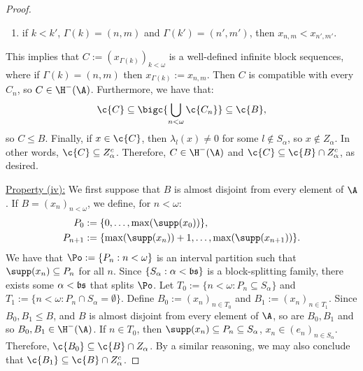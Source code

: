 \documentclass[11pt,reqno]{amsart}
\begin{document}
\begin{proof}
\begin{enumerate}
        \item if $k < k'$, $\Gamma(k) = (n,m)$ and $\Gamma(k') = (n',m')$, then $x_{n,m} < x_{n',m'}$.
    \end{enumerate}
    This implies that $C := (x_{\Gamma(k)})_{k<\omega}$ is a well-defined infinite block sequences, where if $\Gamma(k) = (n,m)$ then $x_{\Gamma(k)} := x_{n,m}$. Then $C$ is compatible with every $C_n$, so $C \in \H^-(\A)$. Furthermore, we have that:
    \begin{align*}
        \c{C} \subseteq \bigc{\bigcup_{n<\omega} \c{C_n}} \subseteq \c{B},
    \end{align*}
    so $C \leq B$. Finally, if $x \in \c{C}$, then $\lambda_l(x) \neq 0$ for some $l \notin S_\alpha$, so $x \notin Z_\alpha$. In other words, $\c{C} \subseteq Z_\alpha^c$. Therefore, $C \in \H^-(\A)$ and $\c{C} \subseteq \c{B} \cap Z_\alpha^c$, as desired.

    \underline{Property (iv):} We first suppose that $B$ is almost disjoint from every element of $\A$. If $B = (x_n)_{n<\omega}$, we define, for $n < \omega$:
    \begin{align*}
        P_0 &:= \{0,\dots,\max(\supp(x_0))\}, \\
        P_{n+1} &:= \{\max(\supp(x_n))+1,\dots,\max(\supp(x_{n+1}))\}.
    \end{align*}
    We have that $\Po := \{P_n : n < \omega\}$ is an interval partition such that $\supp(x_n) \subseteq P_n$ for all $n$. Since $\{S_\alpha : \alpha < \frak{bs}\}$ is a block-splitting family, there exists some $\alpha < \frak{bs}$ that splits $\Po$. Let $T_0 := \{n < \omega : P_n \subseteq S_\alpha\}$ and $T_1 := \{n < \omega : P_n \cap S_\alpha = \emptyset\}$. Define $B_0 := (x_n)_{n \in T_0}$ and $B_1 := (x_n)_{n \in T_1}$. Since $B_0,B_1 \leq B$, and $B$ is almost disjoint from every element of $\A$, so are $B_0,B_1$ and so $B_0,B_1 \in \H^-(\A)$. If $n \in T_0$, then $\supp(x_n) \subseteq P_n \subseteq S_\alpha$, $x_n \in (e_n)_{n \in S_\alpha}$. Therefore, $\c{B_0} \subseteq \c{B} \cap Z_\alpha$. By a similar reasoning, we may also conclude that $\c{B_1} \subseteq \c{B} \cap Z_\alpha^c$.


\end{proof}
\end{document}

